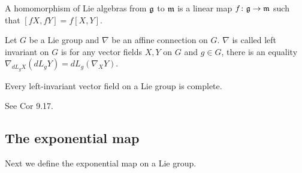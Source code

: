 \begin{definition}
	A homomorphism of Lie algebras from ${\mathfrak g}$ to ${\mathfrak m}$ is a
	linear map $f\colon{\mathfrak g}\to {\mathfrak m}$ such that $[fX, fY]=f[X, Y]$.
\end{definition}
\begin{definition}
	Let $G$ be a Lie group and $ \nabla$ be an affine connection
	on $G$. $\nabla$ is called left invariant on $G$ is for any
	vector fields $X,Y$ on $G$ and $g\in G$, there is an equality
	$\nabla_{dL_gX}(dL_gY)=dL_g(\nabla_XY)$.
\end{definition}
\begin{lemma}
	Every left-invariant vector field on a Lie group is complete.
\end{lemma}
\bproof
See \cite{Lee} Cor 9.17.
\eproof
\subsection{The exponential map}

Next we define the exponential map on a Lie group.

